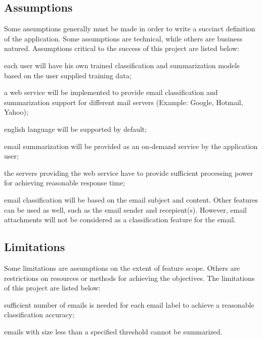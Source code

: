 \subsection{Assumptions}
Some assumptions generally must be made in order to write a succinct definition 
of the application. Some assumptions are technical, while others are business natured.  Assumptions 
critical to the success of this project are listed below:
\begin{my_itemize}
  \item each user will have his own trained classification and summarization 
	models based on the user supplied training data;
  \item a web service will be implemented to provide email 
	classification and summarization support for different mail 
	servers (Example: Google, Hotmail, Yahoo);
  \item english language will be supported by default;
  \item email summarization will be provided as an on-demand service by the application user;
  \item the servers providing the web service have to provide sufficient 
	processing power for achieving reasonable response time;
  \item email classification will be based on the email subject and content. 
	Other features can be used as well, such as the email sender and recepient(s). 
	However, email attachments will not be considered as a classification feature for the email.
\end{my_itemize}

\subsection{Limitations}
Some limitations are assumptions on the extent of feature scope. Others are restrictions on resources 
or methods for achieving the objectives. The limitations of this project are listed below:

\begin{my_itemize}
  \item sufficient number of emails is needed for each email label to achieve 
	a reasonable classification accuracy;
  \item emails with size less than a specified threshold cannot be summarized.
\end{my_itemize}

